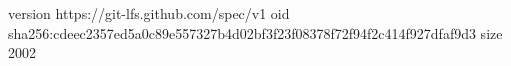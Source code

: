 version https://git-lfs.github.com/spec/v1
oid sha256:cdeec2357ed5a0c89e557327b4d02bf3f23f08378f72f94f2c414f927dfaf9d3
size 2002
